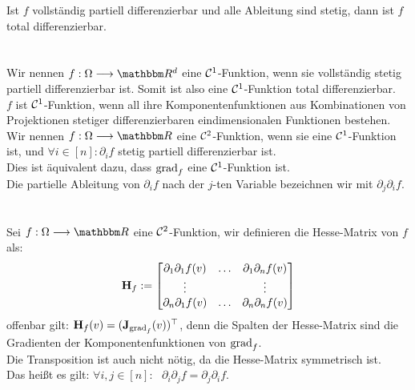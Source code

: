 Ist \(f\) vollständig partiell differenzierbar und alle Ableitung sind stetig, dann ist \(f\) total differenzierbar. \\ \\
 \\
Wir nennen \(f: \Omega \longrightarrow \R^d\) eine \(\mathcal C^1\)-Funktion, wenn sie vollständig stetig partiell differenzierbar ist. Somit ist also eine \(\mathcal C^1\)-Funktion total differenzierbar. \\
\(f\) ist \(\mathcal C^1\)-Funktion, wenn all ihre Komponentenfunktionen aus Kombinationen von Projektionen stetiger differenzierbaren eindimensionalen Funktionen bestehen. \\
Wir nennen \(f: \Omega \longrightarrow \R\) eine \(\mathcal C^2\)-Funktion, wenn sie eine \(\mathcal C^1\)-Funktion ist, und \(\forall i \in [n]: \partial_if\) stetig partiell differenzierbar ist. \\
Dies ist äquivalent dazu, dass \(\text{grad}_f\) eine \(\mathcal C^1\)-Funktion ist. \\Die partielle
Ableitung von \(\partial_i f\) nach der \(j\)-ten Variable bezeichnen wir mit \(\partial_j\partial_if\). \\ \\
 \\
Sei \(f: \Omega \longrightarrow \R\) eine \(\mathcal C^2\)-Funktion, wir definieren die Hesse-Matrix von \(f\) als: \[\textbf{H}_f := \begin{bmatrix}
    \partial_1\partial_1f(v) & \hdots & \partial_1\partial_nf(v) \\
    \vdots & & \vdots \\
    \partial_n\partial_1f(v) & \hdots & \partial_n\partial_nf(v)
\end{bmatrix}\] offenbar gilt: \(\textbf{H}_f(v) = (\textbf{J}_{\text{grad}_f}(v))^{\top}\), denn die Spalten der Hesse-Matrix sind die
Gradienten der Komponentenfunktionen von \(\text{grad}_f\).\\
Die Transposition ist auch nicht nötig, da die Hesse-Matrix symmetrisch ist.\\ Das heißt es gilt: \(\forall i,j\in[n]{:}\text{ } \partial_i\partial_jf = \partial_j\partial_if\). \pagebreak
